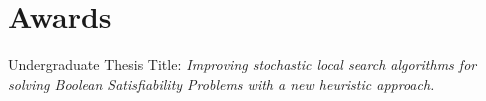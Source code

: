 \documentclass[10pt,a4paper,roman]{moderncv}        %
\begin{document}
\section{Awards}
Undergraduate Thesis Title:\em{ Improving stochastic local search algorithms for
solving Boolean Satisfiability Problems with a new heuristic approach.}
\newline

\nocite{*}



\vspace{5mm}

\end{document}
